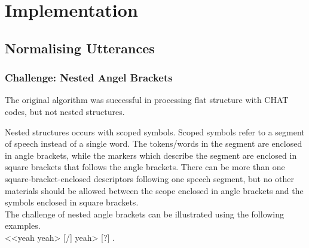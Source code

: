 \chapter{Implementation} %

\label{Chapter4} %


%

\section{Normalising Utterances}
\subsection{Challenge: Nested Angel Brackets}

The original algorithm was successful in processing flat structure with CHAT codes, but not nested structures. 

Nested structures occurs with scoped symbols. Scoped symbols refer to a segment of speech instead of a single word. The tokens/words in the segment are enclosed in angle brackets, while the markers which describe the segment are enclosed in square brackets that follows the angle brackets. There can be more than one square-bracket-enclosed descriptors following one speech segment, but no other materials should be allowed between the scope enclosed in angle brackets and the symbols enclosed in square brackets.\\
The challenge of nested angle brackets can be illustrated using the following examples.\\

<<yeah yeah> [/] yeah> [?] .

